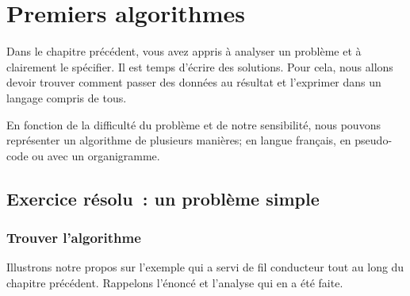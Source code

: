 \chapter{Premiers algorithmes}

	Dans le chapitre précédent, vous avez appris à analyser un problème et
	à clairement le spécifier.  Il est temps d’écrire des solutions.  Pour cela,
	nous allons devoir trouver comment passer des données au résultat et
	l’exprimer dans un langage compris de tous.
	
	En fonction de la difficulté du problème et de notre sensibilité, nous
	pouvons représenter un algorithme de plusieurs manières; en langue français,
	en pseudo-code ou avec un organigramme. 

	\newpage
	\minitoc
	\newpage
	
	\section{Exercice résolu~: un problème simple}
	
		\subsection{Trouver l’algorithme}

			Illustrons notre propos sur l’exemple qui a servi de fil conducteur
			tout au long du chapitre précédent.  Rappelons l’énoncé et l’analyse
			qui en a été faite.
			
